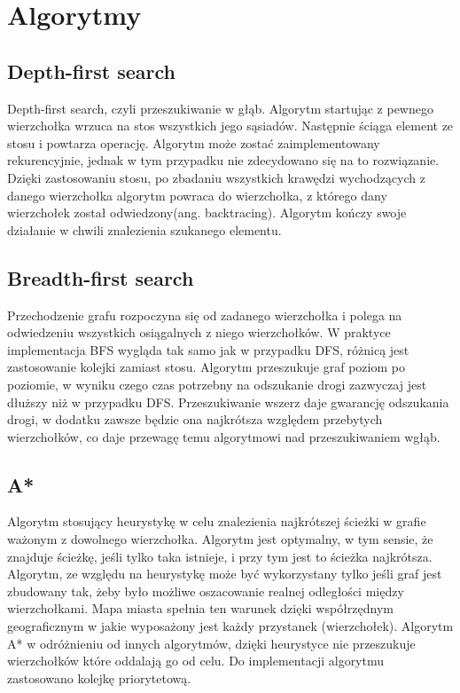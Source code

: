 \documentclass[12pt, polish]{article}
\begin{document}
\section{Algorytmy}

\subsection{Depth-first search}
Depth-first search, czyli przeszukiwanie w głąb. Algorytm startując z pewnego wierzchołka wrzuca na stos wszystkich jego sąsiadów. Następnie ściąga element ze stosu i powtarza operację. Algorytm może zostać zaimplementowany rekurencyjnie, jednak w tym przypadku nie zdecydowano się na to rozwiązanie. Dzięki zastosowaniu stosu, po zbadaniu wszystkich krawędzi wychodzących z danego wierzchołka algorytm powraca do wierzchołka, z którego dany wierzchołek został odwiedzony(ang. backtracing). Algorytm kończy swoje działanie w chwili znalezienia szukanego elementu.




	
\subsection {Breadth-first search} 
Przechodzenie grafu rozpoczyna się od zadanego wierzchołka i polega na odwiedzeniu wszystkich osiągalnych z niego wierzchołków. W praktyce implementacja BFS wygląda tak samo jak w przypadku DFS, różnicą jest zastosowanie kolejki zamiast stosu. Algorytm przeszukuje graf poziom po poziomie, w wyniku czego czas potrzebny na odszukanie drogi zazwyczaj jest dłuższy niż w przypadku DFS. Przeszukiwanie wszerz daje gwarancję odszukania drogi, w dodatku zawsze będzie ona najkrótsza względem przebytych wierzchołków, co daje przewagę temu algorytmowi nad przeszukiwaniem wgłąb. 



\subsection {A*}
Algorytm stosujący heurystykę w celu znalezienia najkrótszej ścieżki w grafie ważonym z dowolnego wierzchołka. Algorytm jest optymalny, w tym sensie, że znajduje ścieżkę, jeśli tylko taka istnieje, i przy tym jest to ścieżka najkrótsza. Algorytm, ze względu na heurystykę może być wykorzystany tylko jeśli graf jest zbudowany tak, żeby było możliwe oszacowanie realnej odległości między wierzchołkami. Mapa miasta spełnia ten warunek dzięki współrzędnym geograficznym w jakie wyposażony jest każdy przystanek (wierzchołek). Algorytm A* w odróżnieniu od innych algorytmów, dzięki heurystyce nie przeszukuje wierzchołków które oddalają go od celu. Do implementacji algorytmu zastosowano kolejkę priorytetową.
\end{document}
